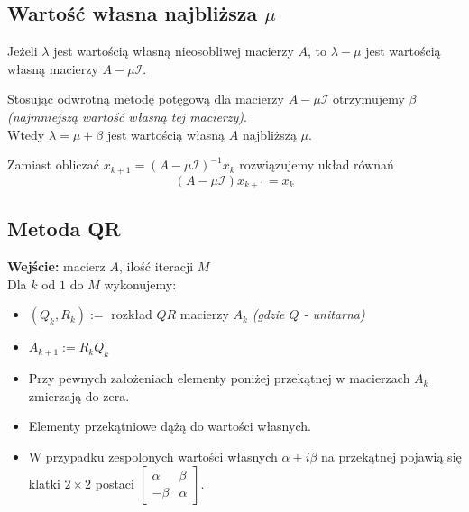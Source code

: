 \documentclass[../mn-notatki.tex]{subfiles}
\begin{document}
\subsection{Wartość własna najbliższa $\mu$}
\begin{tcolorbox}
Jeżeli $\lambda$ jest wartością własną nieosobliwej macierzy $A$, to
$\lambda - \mu$ jest wartością własną macierzy $A - \mu\mathcal{I}$.
\end{tcolorbox}

Stosując odwrotną metodę potęgową dla macierzy $A - \mu\mathcal{I}$ otrzymujemy
$\beta$ \textit{(najmniejszą wartość własną tej macierzy)}.\\

Wtedy $\lambda = \mu + \beta$ jest wartością własną $A$ najbliższą $\mu$.

\begin{tcolorbox}
Zamiast obliczać $x_{k+1} = (A - \mu\mathcal{I})^{-1} x_k$ rozwiązujemy układ równań
\[
(A - \mu\mathcal{I}) x_{k+1} = x_k
\]
\end{tcolorbox}


\subsection{Metoda QR}

\begin{tcolorbox}
\textbf{Wejście:} macierz $A$, ilość iteracji $M$ \\
Dla $k$ od $1$ do $M$ wykonujemy:
\begin{itemize}
    \item $(Q_k, R_k) := $ rozkład $QR$ macierzy $A_k$
    \textit{(gdzie $Q$ - unitarna)}
    \item $A_{k + 1} := R_kQ_k$
\end{itemize}
\end{tcolorbox}

\begin{itemize}
    \item Przy pewnych założeniach elementy poniżej przekątnej w macierzach
    $A_k$ zmierzają do zera.
    \item Elementy przekątniowe dążą do wartości własnych.
    \item W przypadku zespolonych wartości własnych $\alpha \pm i \beta$
    na przekątnej pojawią się klatki $2 \times 2$ postaci $
    \left[ \begin{smallmatrix}
    \alpha & \beta\\
    -\beta & \alpha
    \end{smallmatrix} \right]
    $.
\end{itemize}
\end{document}
